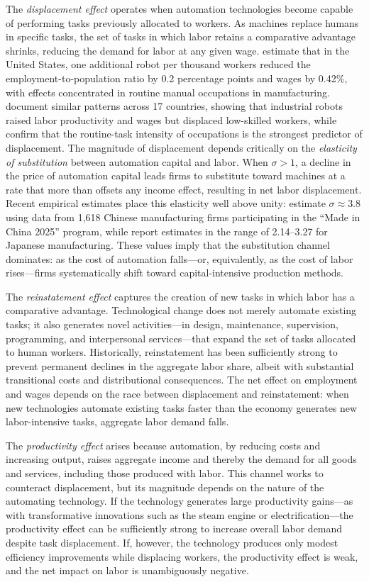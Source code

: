 \documentclass{article}
\begin{document}
The \textit{displacement effect} operates when automation technologies become capable of performing tasks previously allocated to workers. As machines replace humans in specific tasks, the set of tasks in which labor retains a comparative advantage shrinks, reducing the demand for labor at any given wage. \cite{acemoglu2020robots} estimate that in the United States, one additional robot per thousand workers reduced the employment-to-population ratio by 0.2 percentage points and wages by 0.42\%, with effects concentrated in routine manual occupations in manufacturing. \cite{graetz2018} document similar patterns across 17 countries, showing that industrial robots raised labor productivity and wages but displaced low-skilled workers, while \cite{de2022} confirm that the routine-task intensity of occupations is the strongest predictor of displacement. The magnitude of displacement depends critically on the \textit{elasticity of substitution} between automation capital and labor. When $\sigma > 1$, a decline in the price of automation capital leads firms to substitute toward machines at a rate that more than offsets any income effect, resulting in net labor displacement. Recent empirical estimates place this elasticity well above unity: \cite{cheng2021elasticity} estimate $\sigma \approx 3.8$ using data from 1,618 Chinese manufacturing firms participating in the ``Made in China 2025'' program, while \cite{adachi2022} report estimates in the range of 2.14--3.27 for Japanese manufacturing. These values imply that the substitution channel dominates: as the cost of automation falls---or, equivalently, as the cost of labor rises---firms systematically shift toward capital-intensive production methods.

The \textit{reinstatement effect} captures the creation of new tasks in which labor has a comparative advantage. Technological change does not merely automate existing tasks; it also generates novel activities---in design, maintenance, supervision, programming, and interpersonal services---that expand the set of tasks allocated to human workers. Historically, reinstatement has been sufficiently strong to prevent permanent declines in the aggregate labor share, albeit with substantial transitional costs and distributional consequences. The net effect on employment and wages depends on the race between displacement and reinstatement: when new technologies automate existing tasks faster than the economy generates new labor-intensive tasks, aggregate labor demand falls.

The \textit{productivity effect} arises because automation, by reducing costs and increasing output, raises aggregate income and thereby the demand for all goods and services, including those produced with labor. This channel works to counteract displacement, but its magnitude depends on the nature of the automating technology. If the technology generates large productivity gains---as with transformative innovations such as the steam engine or electrification---the productivity effect can be sufficiently strong to increase overall labor demand despite task displacement. If, however, the technology produces only modest efficiency improvements while displacing workers, the productivity effect is weak, and the net impact on labor is unambiguously negative.
\end{document}
